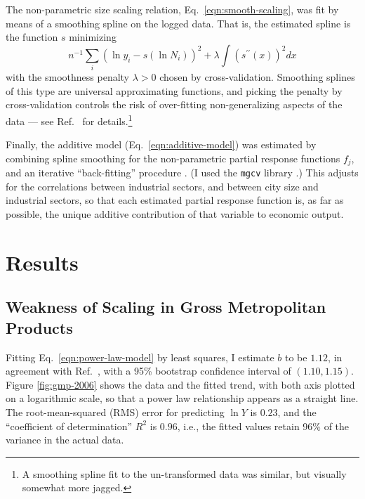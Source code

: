 \documentclass{pnastwo}
\begin{document}
\begin{article}
The non-parametric size scaling relation, Eq.\ \ref{eqn:smooth-scaling}, was
fit by means of a smoothing spline \cite{tEoSL-2nd,Wahba-spline-models} on the
logged data.  That is, the estimated spline is the function $s$ minimizing
\begin{equation}
n^{-1}\sum_{i}{(\ln{y_i} - s(\ln{N_i}))^2} +  \lambda\int{(s^{\prime\prime}(x))^2dx}
\end{equation}
with the smoothness penalty $\lambda > 0$ chosen by cross-validation.
Smoothing splines of this type are universal approximating functions, and
picking the penalty by cross-validation controls the risk of over-fitting
non-generalizing aspects of the data --- see Ref.\ \cite{Wahba-spline-models}
for details.\footnote{A smoothing spline fit to the un-transformed data was
  similar, but visually somewhat more jagged.}

Finally, the additive model (Eq.\ \ref{eqn:additive-model}) was estimated by
combining spline smoothing for the non-parametric partial response functions
$f_j$, and an iterative ``back-fitting'' procedure
\cite{Buja-Hastie-Tibshirani-additive-models}.  (I used the \texttt{mgcv}
library \cite{Wood-mgcv-2004}.)  This adjusts for the correlations between
industrial sectors, and between city size and industrial sectors, so that each
estimated partial response function is, as far as possible, the unique additive
contribution of that variable to economic output.

\section{Results}

\subsection{Weakness of Scaling in Gross Metropolitan Products}
\label{sec:no-scaling}

Fitting Eq.\ \ref{eqn:power-law-model} by least squares, I estimate $b$ to be
$1.12$, in agreement with Ref.\
\cite{Bettencout-et-al-growth-innovation-scaling}, with a 95\% bootstrap
confidence interval \cite{Wasserman-all-of-stats} of $(1.10, 1.15)$.  Figure
\ref{fig:gmp-2006} shows the data and the fitted trend, with both axis plotted
on a logarithmic scale, so that a power law relationship appears as a straight
line.  The root-mean-squared (RMS) error for predicting $\ln{Y}$ is $0.23$, and
the ``coefficient of determination'' $R^2$ is $0.96$, i.e., the fitted values
retain 96\% of the variance in the actual data.


\end{article}
\end{document}
